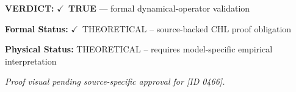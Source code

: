 \textbf{VERDICT:} \ensuremath{\checkmark}\ \textbf{TRUE} --- formal dynamical-operator validation

\textbf{Formal Status:} \ensuremath{\checkmark}\ THEORETICAL -- source-backed CHL proof obligation

\textbf{Physical Status:} THEORETICAL -- requires model-specific empirical interpretation
\par\vspace{0.45em}
\par
\vfill
\begingroup\footnotesize\itshape
Proof visual pending source-specific approval for [ID 0466].
\par\endgroup
\vfill
\endgroup
\endgroup
